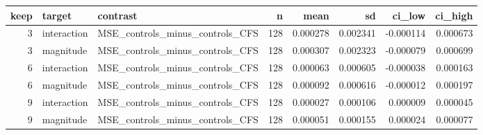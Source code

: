 \begin{tabular}{rllrrrrr}
\toprule
keep & target & contrast & n & mean & sd & ci_low & ci_high \\
\midrule
3 & interaction & MSE_controls_minus_controls_CFS & 128 & 0.000278 & 0.002341 & -0.000114 & 0.000673 \\
3 & magnitude & MSE_controls_minus_controls_CFS & 128 & 0.000307 & 0.002323 & -0.000079 & 0.000699 \\
6 & interaction & MSE_controls_minus_controls_CFS & 128 & 0.000063 & 0.000605 & -0.000038 & 0.000163 \\
6 & magnitude & MSE_controls_minus_controls_CFS & 128 & 0.000092 & 0.000616 & -0.000012 & 0.000197 \\
9 & interaction & MSE_controls_minus_controls_CFS & 128 & 0.000027 & 0.000106 & 0.000009 & 0.000045 \\
9 & magnitude & MSE_controls_minus_controls_CFS & 128 & 0.000051 & 0.000155 & 0.000024 & 0.000077 \\
\bottomrule
\end{tabular}

